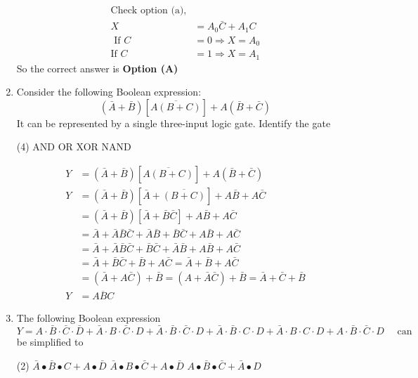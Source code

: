 \begin{enumerate}
\begin{answer}
\begin{align*}
\text{Check option (a),}\\
X&=A_{0} \bar{C}+A_{1} C\\
\text{	If }C&=0 \Rightarrow X=A_{0}\\
\text{If }C&=1 \Rightarrow X=A_{1}
\end{align*}
So the correct answer is \textbf{Option (A)}
\end{answer}
	\item Consider the following Boolean expression:
	$$
	(\bar{A}+\bar{B})[\overline{A(B+C)}]+A(\bar{B}+\bar{C})
	$$
	It can be represented by a single three-input logic gate. Identify the gate
\begin{tasks}(4)
\task[\textbf{A.}]  AND
\task[\textbf{B.}] OR
\task[\textbf{C.}] XOR
\task[\textbf{D.}] NAND
\end{tasks}
\begin{answer}
\begin{align*}
Y&=(\bar{A}+\bar{B})[\overline{A(B+C)}]+A(\bar{B}+\bar{C})\\
Y&=(\bar{A}+\bar{B})[\bar{A}+\overline{(B+C)}]+A \bar{B}+A \bar{C}\\
&=(\bar{A}+\bar{B})[\bar{A}+\bar{B} \bar{C}]+A \bar{B}+A \bar{C}\\
&=\bar{A}+\bar{A} \bar{B} \bar{C}+\bar{A} \bar{B}+\bar{B} \bar{C}+A \bar{B}+A \bar{C}\\
&=\bar{A}+\bar{A} \bar{B} \bar{C}+\bar{B} \bar{C}+\bar{A} \bar{B}+A \bar{B}+A \bar{C}\\
&=\bar{A}+\bar{B} \bar{C}+\bar{B}+A \bar{C}=\bar{A}+\bar{B}+A \bar{C}\\
&=(\bar{A}+A \bar{C})+\bar{B}=(A+\bar{A} \bar{C})+\bar{B}=\bar{A}+\bar{C}+\bar{B}\\
Y&=\overline{A B C}
\end{align*}
\end{answer}
	\item The following Boolean expression
	$$
	Y=A \cdot \bar{B} \cdot \bar{C} \cdot \bar{D}+\bar{A} \cdot B \cdot \bar{C} \cdot D+\bar{A} \cdot \bar{B} \cdot \bar{C} \cdot D+\bar{A} \cdot \bar{B} \cdot C \cdot D+\bar{A} \cdot B \cdot C \cdot D+A \cdot \bar{B} \cdot \bar{C} \cdot D \quad \text { can }
	$$
	be simplified to
\begin{tasks}(2)
\task[\textbf{A.}] $\bar{A} \bullet \bar{B} \bullet C+A \bullet \bar{D}$
\task[\textbf{B.}]  $\bar{A} \bullet B \bullet \bar{C}+A \bullet \bar{D}$
\task[\textbf{C.}] $A \bullet \bar{B} \bullet \bar{C}+\bar{A} \bullet D$

\end{tasks}
\end{enumerate}
